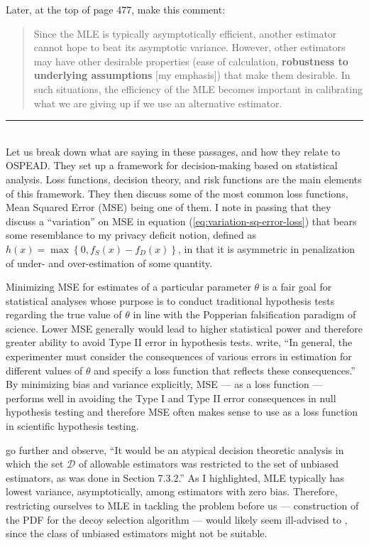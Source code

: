 \documentclass[english]{article}
\begin{document}
Later, at the top of page 477, \cite{CasellaBerger2002} make this
comment:
\begin{quote}
Since the MLE is typically asymptotically efficient, another estimator
cannot hope to beat its asymptotic variance. However, other estimators
may have other desirable properties (ease of calculation, \textbf{robustness
to underlying assumptions} {[}my emphasis{]}) that make them desirable.
In such situations, the efficiency of the MLE becomes important in
calibrating what we are giving up if we use an alternative estimator.
\end{quote}
\par\noindent\rule{\textwidth}{0.4pt}\\

Let us break down what \cite{CasellaBerger2002} are saying in these
passages, and how they relate to OSPEAD. They set up a framework for
decision-making based on statistical analysis. Loss functions, decision
theory, and risk functions are the main elements of this framework.
They then discuss some of the most common loss functions, Mean Squared
Error (MSE) being one of them. I note in passing that they discuss
a ``variation'' on MSE in equation (\ref{eq:variation-sq-error-loss})
that bears some resemblance to my privacy deficit notion, defined
as $h(x)=\max\left\{ 0,f_{S}(x)-f_{D}(x)\right\} $, in that it is
asymmetric in penalization of under- and over-estimation of some quantity.

Minimizing MSE for estimates of a particular parameter $\theta$ is
a fair goal for statistical analyses whose purpose is to conduct traditional
hypothesis tests regarding the true value of $\theta$ in line with
the Popperian falsification paradigm of science. Lower MSE generally
would lead to higher statistical power and therefore greater ability
to avoid Type II error in hypothesis tests. \cite{CasellaBerger2002}
write, ``In general, the experimenter must consider the consequences
of various errors in estimation for different values of $\theta$
and specify a loss function that reflects these consequences.'' By
minimizing bias and variance explicitly, MSE --- as a loss function
--- performs well in avoiding the Type I and Type II error consequences
in null hypothesis testing and therefore MSE often makes sense to
use as a loss function in scientific hypothesis testing.

\cite{CasellaBerger2002} go further and observe, ``It would be an
atypical decision theoretic analysis in which the set $\mathcal{D}$
of allowable estimators was restricted to the set of unbiased estimators,
as was done in Section 7.3.2.'' As I highlighted, MLE typically has
lowest variance, asymptotically, among estimators with zero bias.
Therefore, restricting ourselves to MLE in tackling the problem before
us --- construction of the PDF for the decoy selection algorithm
--- would likely seem ill-advised to \cite{CasellaBerger2002}, since
the class of unbiased estimators might not be suitable.
\end{document}
